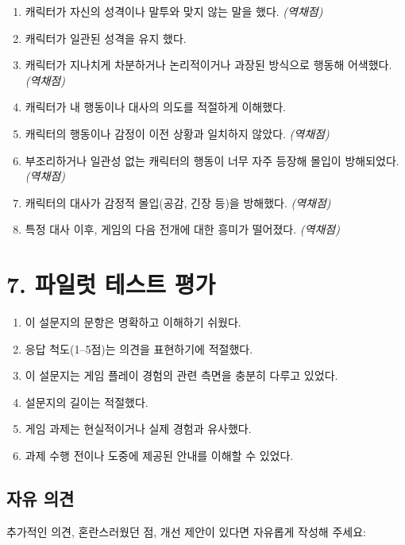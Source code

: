 \documentclass[12pt]{article}
\begin{document}
\begin{enumerate}[resume]
    \item 캐릭터가 자신의 성격이나 말투와 맞지 않는 말을 했다. \textit{(역채점)}
    \item 캐릭터가 일관된 성격을 유지 했다.
    \item 캐릭터가 지나치게 차분하거나 논리적이거나 과장된 방식으로 행동해 어색했다. \textit{(역채점)}
    \item 캐릭터가 내 행동이나 대사의 의도를 적절하게 이해했다.
    \item 캐릭터의 행동이나 감정이 이전 상황과 일치하지 않았다. \textit{(역채점)}
    \item 부조리하거나 일관성 없는 캐릭터의 행동이 너무 자주 등장해 몰입이 방해되었다. \textit{(역채점)}
    \item 캐릭터의 대사가 감정적 몰입(공감, 긴장 등)을 방해했다. \textit{(역채점)}
    \item 특정 대사 이후, 게임의 다음 전개에 대한 흥미가 떨어졌다. \textit{(역채점)}
\end{enumerate}

\section*{7. 파일럿 테스트 평가}

\begin{enumerate}[resume]
  \item 이 설문지의 문항은 명확하고 이해하기 쉬웠다.
  \item 응답 척도(1–5점)는 의견을 표현하기에 적절했다.
  \item 이 설문지는 게임 플레이 경험의 관련 측면을 충분히 다루고 있었다.
  \item 설문지의 길이는 적절했다.
  \item 게임 과제는 현실적이거나 실제 경험과 유사했다.
  \item 과제 수행 전이나 도중에 제공된 안내를 이해할 수 있었다.
\end{enumerate}

\subsection*{자유 의견}

추가적인 의견, 혼란스러웠던 점, 개선 제안이 있다면 자유롭게 작성해 주세요:
\end{document}
